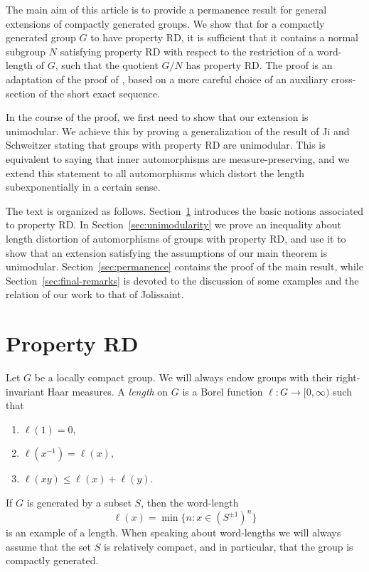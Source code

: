 \documentclass{amsart}
\theoremstyle{definition}
\theoremstyle{remark}
\begin{document}
The main aim of this article is to provide a permanence result for
general extensions of compactly generated groups. We show that for a
compactly generated group $G$ to have property RD, it is sufficient
that it contains a normal subgroup $N$ satisfying property RD with
respect to the restriction of a word-length of $G$, such that the
quotient $G/N$ has property RD. The proof is an adaptation of the
proof of \cite[Proposition 2.1.9]{Jolissaint1990}, based on a more
careful choice of an auxiliary cross-section of the short exact
sequence.

In the course of the proof, we first need to show that our extension
is unimodular. We achieve this by proving a generalization of the
result of Ji and Schweitzer \cite[Theorem 2.2]{Ronghui1996} stating
that groups with property RD are unimodular. This is equivalent to
saying that inner automorphisms are measure-preserving, and we extend
this statement to all automorphisms which distort the length
subexponentially in a certain sense.

The text is organized as follows. Section~\ref{sec:property-rd}
introduces the basic notions associated to property RD. In
Section~\ref{sec:unimodularity} we prove an inequality about length
distortion of automorphisms of groups with property RD, and use it to
show that an extension satisfying the assumptions of our main theorem
is unimodular. Section~\ref{sec:permanence} contains the proof of the
main result, while Section~\ref{sec:final-remarks} is devoted to the
discussion of some examples and the relation of our work to that of
Jolissaint.

\section{Property RD}
\label{sec:property-rd}

Let $G$ be a locally compact group. We will always endow groups with
their right-invariant Haar measures. A \emph{length} on $G$ is a Borel
function $\ell\colon G\to [0,\infty)$ such that
\begin{enumerate}
\item $\ell(1)=0$,
\item $\ell(x^{-1})=\ell(x)$,
\item $\ell(xy)\leq\ell(x)+\ell(y)$.  
\end{enumerate}
If $G$ is generated by a subset $S$, then the word-length
\begin{equation}
\ell(x)=\min\{n : x\in (S^{\pm1})^n\}
\end{equation}
is an example of a length. When speaking about word-lengths we will
always assume that the set $S$ is relatively compact, and in
particular, that the group is compactly generated.
\end{document}
